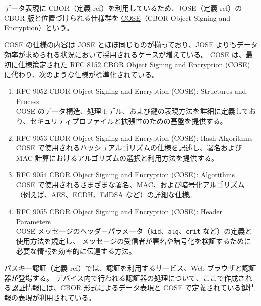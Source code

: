 \documentclass[uplatex]{jsarticle}
\def\ref#1{ref}%
\def\label#1{}%
\newcounter{thm}[section]
\begin{document}
\begin{dfn}[COSE]\label{dfn:cose}
データ表現に CBOR（定義 \ref{dfn:cbor}）を利用しているため、JOSE（定義 \ref{dfn:jose}）の CBOR 版と位置づけられる仕様群を
\underline{COSE}（CBOR Object Signing and Encryption）という。
\end{dfn}

COSE の仕様の内容は JOSE とほぼ同じものが揃っており、JOSE よりもデータ効率が求められる状況において採用されるケースが増えている。
COSE は、最初に仕様策定された RFC 8152 CBOR Object Signing and Encryption (COSE) に代わり、次のような仕様が標準化されている。
\begin{enumerate}
\item RFC 9052 CBOR Object Signing and Encryption (COSE): Structures and Process\\
COSE のデータ構造、処理モデル、および鍵の表現方法を詳細に定義しており、セキュリティプロファイルと拡張性のための基盤を提供する。
\item RFC 9053 CBOR Object Signing and Encryption (COSE): Hash Algorithms\\
COSE で使用されるハッシュアルゴリズムの仕様を記述し、署名および MAC 計算におけるアルゴリズムの選択と利用方法を提供する。
\item RFC 9054 CBOR Object Signing and Encryption (COSE): Algorithms\\
COSE で使用されるさまざまな署名、MAC、および暗号化アルゴリズム（例えば、AES、ECDH、EdDSA など）の詳細な仕様。
\item RFC 9055 CBOR Object Signing and Encryption (COSE): Header Parameters\\
COSE メッセージのヘッダーパラメータ（\texttt{kid}、\texttt{alg}、\texttt{crit} など）の定義と使用方法を規定し、
メッセージの受信者が署名や暗号化を検証するために必要な情報を効率的に伝達する方法。
\end{enumerate}

\begin{exa}\label{exa:ch6-passkey-cbor}
パスキー認証（定義 \ref{dfn:passkey}）では、認証を利用するサービス、Web ブラウザと認証器が登場する。
デバイス内で行われる認証器の処理について、ここで作成される認証情報には、CBOR 形式によるデータ表現と COSE で定義されている鍵情報の表現が利用されている。
\end{exa}

\end{document}
